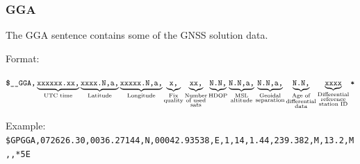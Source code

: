 \documentclass{zubaxdoc}
\begin{document}
\subsubsection{GGA}\label{sec:nmea_sentence_GGA}

The GGA sentence contains some of the GNSS solution data.

Format:

$\texttt{\$\_\_GGA,}%
\underbrace{\texttt{xxxxxx.xx,}}_{\text{UTC time}}%
\underbrace{\texttt{xxxx.N,a,}}_{\text{Latitude}}%
\underbrace{\texttt{xxxxx.N,a,}}_{\text{Longitude}}%
\underbrace{\texttt{x,}}_{\substack{\text{Fix} \\ \text{quality}}}%
\underbrace{\texttt{xx,}}_{\substack{\text{Number} \\ \text{of used} \\ \text{sats}}}%
\underbrace{\texttt{N.N,}}_{\text{HDOP}}%
\underbrace{\texttt{N.N,a,}}_{\substack{\text{MSL} \\ \text{altitude}}}%
\underbrace{\texttt{N.N,a,}}_{\substack{\text{Geoidal} \\ \text{separation}}}%
\underbrace{\texttt{N.N,}}_{\substack{\text{Age of} \\ \text{differential} \\ \text{data}}}%
\underbrace{\texttt{xxxx}}_{\substack{\text{Differential} \\ \text{reference} \\ \text{station ID}}}%
\texttt{\text{*}}$

Example: \verb|$GPGGA,072626.30,0036.27144,N,00042.93538,E,1,14,1.44,239.382,M,13.2,M,,*5E|
\end{document}
